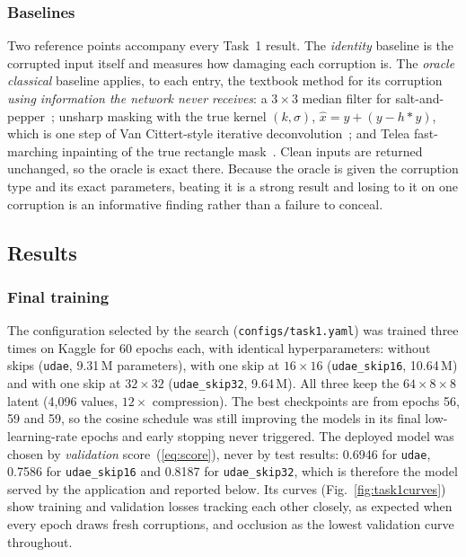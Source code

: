 \documentclass[conference]{IEEEtran}
\begin{document}
\subsubsection{Baselines}

Two reference points accompany every Task~1 result. The \emph{identity} baseline
is the corrupted input itself and measures how damaging each corruption is. The
\emph{oracle classical} baseline applies, to each entry, the textbook method for
its corruption \emph{using information the network never receives}: a $3\times3$
median filter for salt-and-pepper~\cite{hwang1995adaptive,chan2005salt}; unsharp
masking with the true kernel $(k,\sigma)$,
$\hat{x} = y + (y - h \ast y)$, which is one step of Van Cittert-style iterative
deconvolution~\cite{richardson1972bayesian,lucy1974iterative}; and Telea
fast-marching inpainting of the true rectangle
mask~\cite{telea2004image,bertalmio2000image,bertalmio2001navier}. Clean inputs
are returned unchanged, so the oracle is exact there. Because the oracle is given
the corruption type and its exact parameters, beating it is a strong result and
losing to it on one corruption is an informative finding rather than a failure
to conceal.

\subsection{Results}

\subsubsection{Final training}
The configuration selected by the search (\texttt{configs/task1.yaml}) was
trained three times on Kaggle for 60 epochs each, with identical hyperparameters:
without skips (\texttt{udae}, 9.31\,M parameters), with one skip at $16\times16$
(\texttt{udae\_skip16}, 10.64\,M) and with one skip at $32\times32$
(\texttt{udae\_skip32}, 9.64\,M). All three keep the $64\times8\times8$ latent
(4{,}096 values, $12\times$ compression). The best checkpoints are from epochs 56,
59 and 59, so the cosine schedule was still improving the models in its final
low-learning-rate epochs and early stopping never triggered. The deployed model
was chosen by \emph{validation} score~(\ref{eq:score}), never by test results:
0.6946 for \texttt{udae}, 0.7586 for \texttt{udae\_skip16} and 0.8187 for
\texttt{udae\_skip32}, which is therefore the model served by the application and
reported below. Its curves (Fig.~\ref{fig:task1curves}) show training and
validation losses tracking each other closely, as expected when every epoch draws
fresh corruptions, and occlusion as the lowest validation curve throughout.
\end{document}
